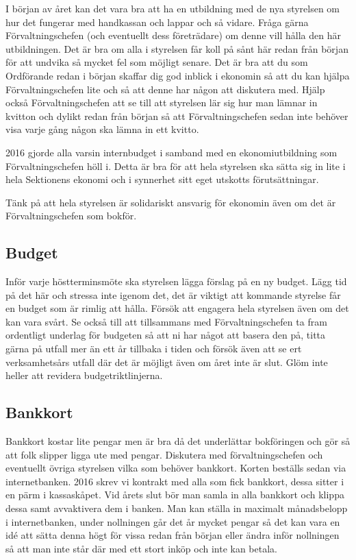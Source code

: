\documentclass[10pt]{article}
\begin{document}
I början av året kan det vara bra att ha en utbildning med de nya styrelsen om hur det fungerar med handkassan och lappar och så vidare. Fråga gärna Förvaltningschefen (och eventuellt dess företrädare) om denne vill hålla den här utbildningen. Det är bra om alla i styrelsen får koll på sånt här redan från början för att undvika så mycket fel som möjligt senare. Det är bra att du som Ordförande redan i början skaffar dig god inblick i ekonomin så att du kan hjälpa Förvaltningschefen lite och så att denne har någon att diskutera med. Hjälp också Förvaltningschefen att se till att styrelsen lär sig hur man lämnar in kvitton och dylikt redan från början så att Förvaltningschefen sedan inte behöver visa varje gång någon ska lämna in ett kvitto.

2016 gjorde alla varsin internbudget i samband med en ekonomiutbildning som Förvaltningschefen höll i. Detta är bra för att hela styrelsen ska sätta sig in lite i hela Sektionens ekonomi och i synnerhet sitt eget utskotts förutsättningar.

Tänk på att hela styrelsen är solidariskt ansvarig för ekonomin även om det är Förvaltningschefen som bokför.

\subsection{Budget}

Inför varje höstterminsmöte ska styrelsen lägga förslag på en ny budget. Lägg tid på det här och stressa inte igenom det, det är viktigt att kommande styrelse får en budget som är rimlig att hålla. Försök att engagera hela styrelsen även om det kan vara svårt. Se också till att tillsammans med Förvaltningschefen ta fram ordentligt underlag för budgeten så att ni har något att basera den på, titta gärna på utfall mer än ett år tillbaka i tiden och försök även att se ert verksamhetsårs utfall där det är möjligt även om året inte är slut. Glöm inte heller att revidera budgetriktlinjerna.

\subsection{Bankkort}

Bankkort kostar lite pengar men är bra då det underlättar bokföringen och gör så att folk slipper ligga ute med pengar. Diskutera med förvaltningschefen och eventuellt övriga styrelsen vilka som behöver bankkort. Korten beställs sedan via internetbanken. 2016 skrev vi kontrakt med alla som fick bankkort, dessa sitter i en pärm i kassaskåpet. Vid årets slut bör man samla in alla bankkort och klippa dessa samt avvaktivera dem i banken. Man kan ställa in maximalt månadsbelopp i internetbanken, under nollningen går det år mycket pengar så det kan vara en idé att sätta denna högt för vissa redan från början eller ändra inför nollningen så att man inte står där med ett stort inköp och inte kan betala.
\end{document}
